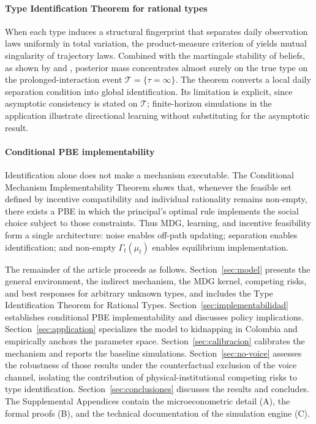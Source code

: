 \documentclass[review,authoryear,12pt]{elsarticle}
\theoremstyle{plain}
\theoremstyle{definition}
\newcommand{\1}{\mathbf{1}}
\begin{document}
\paragraph{Type Identification Theorem for rational types}
When each type induces a structural fingerprint that separates daily observation laws uniformly in total variation, the product-measure criterion of \citet{Kakutani1948} yields mutual singularity of trajectory laws. Combined with the martingale stability of beliefs, as shown by \citet{Doob1953Stochastic} and \citet{BlackwellDubins1962}, posterior mass concentrates almost surely on the true type on the prolonged-interaction event $\mathcal{T}=\{\tau=\infty\}$. The theorem converts a local daily separation condition into global identification. Its limitation is explicit, since asymptotic consistency is stated on $\mathcal{T}$; finite-horizon simulations in the application illustrate directional learning without substituting for the asymptotic result.

\paragraph{Conditional PBE implementability}
Identification alone does not make a mechanism executable. The Conditional Mechanism Implementability Theorem shows that, whenever the feasible set defined by incentive compatibility and individual rationality remains non-empty, there exists a PBE in which the principal's optimal rule implements the social choice subject to those constraints. Thus MDG, learning, and incentive feasibility form a single architecture: noise enables off-path updating; separation enables identification; and non-empty $\Gamma_t(\mu_t)$ enables equilibrium implementation.

The remainder of the article proceeds as follows. Section~\ref{sec:model} presents the general environment, the indirect mechanism, the MDG kernel, competing risks, and best responses for arbitrary unknown types, and includes the Type Identification Theorem for Rational Types. Section~\ref{sec:implementabilidad} establishes conditional PBE implementability and discusses policy implications. Section~\ref{sec:application} specializes the model to kidnapping in Colombia and empirically anchors the parameter space. Section~\ref{sec:calibracion} calibrates the mechanism and reports the baseline simulations. Section~\ref{sec:no-voice} assesses the robustness of those results under the counterfactual exclusion of the voice channel, isolating the contribution of physical-institutional competing risks to type identification. Section~\ref{sec:conclusiones} discusses the results and concludes. The Supplemental Appendices contain the microeconometric detail (A), the formal proofs (B), and the technical documentation of the simulation engine (C).
\end{document}
